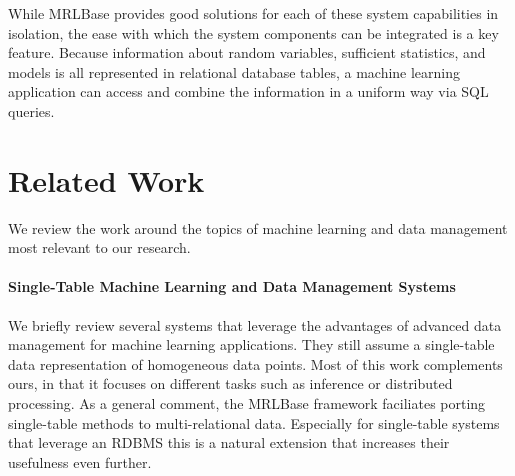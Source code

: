 \documentclass{acm_proc_article-sp}
\begin{document}
While MRLBase provides good solutions for each of these system capabilities in isolation, the ease with which the system components can be integrated is a key feature. Because information about random variables, sufficient statistics, and models 
is all represented in relational database tables,
a machine learning application can access and combine the information in a uniform way via SQL queries.




\section{Related Work} \label{sec:related}
We review the work around the topics of machine learning and data management most relevant to our research.
\paragraph{Single-Table Machine Learning and Data Management Systems}
We briefly review several systems that leverage the advantages of advanced data management for machine learning applications. 
They still 
assume a single-table data representation of homogeneous data points.  Most of this work complements ours, in that it focuses on different tasks such as inference or distributed processing. As a general comment, the MRLBase framework faciliates porting single-table methods to multi-relational data. Especially for single-table systems that leverage an RDBMS this is a natural extension that increases their usefulness even further.


\end{document}
